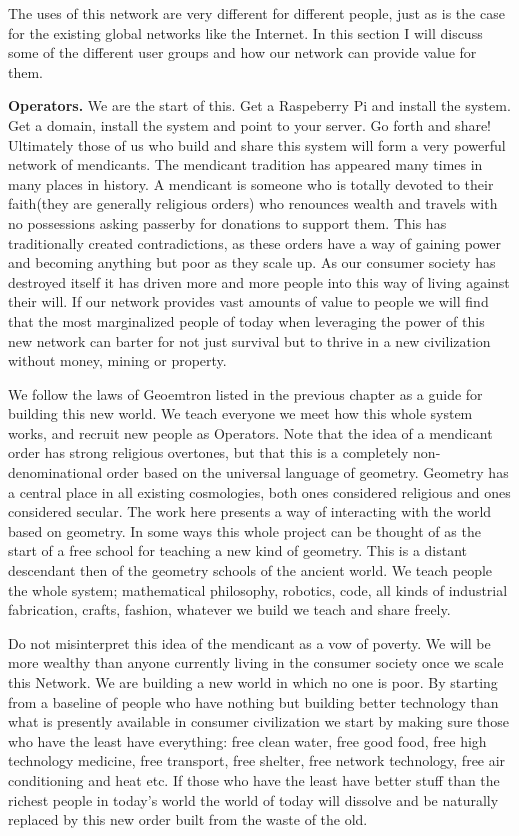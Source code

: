 \documentclass{report}
\begin{document}
The uses of this network are very different for different people, just
as is the case for the existing global networks like the Internet. In
this section I will discuss some of the different user groups and how
our network can provide value for them.

\textbf{Operators.} We are the start of this. Get a Raspeberry Pi and
install the system. Get a domain, install the system and point to your
server. Go forth and share! Ultimately those of us who build and share
this system will form a very powerful network of mendicants. The
mendicant tradition has appeared many times in many places in history. A
mendicant is someone who is totally devoted to their faith(they are
generally religious orders) who renounces wealth and travels with no
possessions asking passerby for donations to support them. This has
traditionally created contradictions, as these orders have a way of
gaining power and becoming anything but poor as they scale up. As our
consumer society has destroyed itself it has driven more and more people
into this way of living against their will. If our network provides vast
amounts of value to people we will find that the most marginalized
people of today when leveraging the power of this new network can barter
for not just survival but to thrive in a new civilization without money,
mining or property.

We follow the laws of Geoemtron listed in the previous chapter as a
guide for building this new world. We teach everyone we meet how this
whole system works, and recruit new people as Operators. Note that the
idea of a mendicant order has strong religious overtones, but that this
is a completely non-denominational order based on the universal language
of geometry. Geometry has a central place in all existing cosmologies,
both ones considered religious and ones considered secular. The work
here presents a way of interacting with the world based on geometry. In
some ways this whole project can be thought of as the start of a free
school for teaching a new kind of geometry. This is a distant descendant
then of the geometry schools of the ancient world. We teach people the
whole system; mathematical philosophy, robotics, code, all kinds of
industrial fabrication, crafts, fashion, whatever we build we teach and
share freely.

Do not misinterpret this idea of the mendicant as a vow of poverty. We
will be more wealthy than anyone currently living in the consumer
society once we scale this Network. We are building a new world in which
no one is poor. By starting from a baseline of people who have nothing
but building better technology than what is presently available in
consumer civilization we start by making sure those who have the least
have everything: free clean water, free good food, free high technology
medicine, free transport, free shelter, free network technology, free
air conditioning and heat etc. If those who have the least have better
stuff than the richest people in today's world the world of today will
dissolve and be naturally replaced by this new order built from the
waste of the old.
\end{document}
